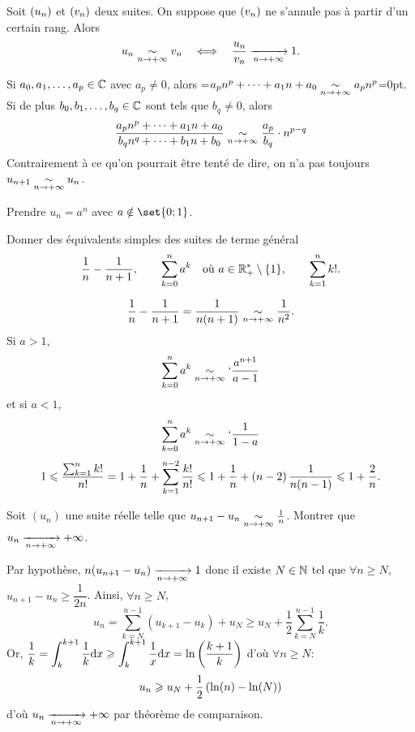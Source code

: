 \documentclass{magnolia}
\begin{document}
\begin{proposition}[utile=-3]
Soit $\left(u_n\right)$ et $\left(v_n\right)$ deux suites. On suppose que $\left(v_n\right)$ ne s'annule
pas à partir d'un certain rang. Alors
\[u_n\underset{n\rightarrow +\infty}{\sim} v_n \quad\Longleftrightarrow\quad \frac{u_n}{v_n}
  \xrightarrow[n\rightarrow +\infty]{} 1.\]
\end{proposition}

\begin{remarques}
\remarque Si $a_0,a_1,\ldots,a_p\in\mathbb{C}$ avec $a_p\neq 0$, alors
  =\hbox{$a_p n^p+\cdots+a_1n+a_0\underset{n\rightarrow +\infty}{\sim} a_p n^p$}=0pt.
  Si de plus $b_0,b_1,\ldots,b_q\in\mathbb{C}$ sont tels que $b_q\neq 0$, alors
  \[\frac{a_p n^p+\cdots+a_1 n+a_0}{b_q n^q+\cdots+b_1 n+b_0}\underset{n\rightarrow +\infty}{\sim}
    \frac{a_p}{b_q}\cdot n^{p-q}\]
\remarque Contrairement à ce qu'on pourrait être tenté de dire, on n'a pas
  toujours $u_{n+1}\underset{n\rightarrow +\infty}{\sim}u_n$.
\begin{sol}
Prendre $u_n=a^n$ avec $a\notin \set{0;1}$.
\end{sol}
\end{remarques}

\begin{exos}
\exo Donner des équivalents simples des suites de terme général
  \[\frac{1}{n}-\frac{1}{n+1}, \qquad \sum_{k=0}^n a^k
    \quad\text{où $a\in\mathbb{R}_+^*\setminus\left\{1\right\}$}, \qquad \sum_{k=1}^n k!.\]
    \begin{sol}
    $$\frac{1}{n}-\frac{1}{n+1}=\frac{1}{n(n+1)}\underset{n\rightarrow +\infty}{\sim}\frac{1}{n^2}.$$
    Si $a>1$, $$\sum_{k=0}^n a^k\underset{n\rightarrow +\infty}{\sim}`\frac{a^{n+1}}{a-1}$$ et si $a<1$, $$\sum_{k=0}^n a^k\underset{n\rightarrow +\infty}{\sim}`\frac{1}{1-a}$$
    $$1\leqslant \frac{\sum_{k=1}^n k!}{n!}=1+\frac{1}{n}+\sum_{k=1}^{n-2}\frac{k!}{n!}\leqslant 1+\frac{1}{n}+\left(n-2\right)\frac{1}{n(n-1)}\leqslant 1+\frac{2}{n}.$$
    
    
    \end{sol}
\exo Soit $(u_n)$ une suite réelle telle que
  $u_{n+1}-u_n \underset{n\rightarrow +\infty}{\sim} \frac{1}{n}$.
  Montrer que $u_n\xrightarrow[n\rightarrow +\infty]{}+\infty$.
  \begin{sol}
  Par hypothèse, $n(u_{n+1}-u_n) \xrightarrow[n\rightarrow +\infty]{}{1}$ donc il existe $N\in \mathbb{N}$ tel que $\forall n \geq N$, $u_{n+1}-u_n \geq \dfrac{1}{2n}$. Ainsi,
  $\forall n \geq N$, $$u_n=\sum_{k=N}^{n-1} (u_{k+1}-u_k) + u_N \geq u_N + \frac{1}{2}\sum_{k=N}^{n-1}\frac{1}{k}.$$
  Or, $\displaystyle \frac{1}{k}=\int_{k}^{k+1}\frac{1}{k}\mathrm{d}x\geqslant \displaystyle \int_{k}^{k+1}\frac{1}{x}\mathrm{d}x=\ln\left(\frac{k+1}{k}\right)$ d'où $\forall n \geq N$: $$u_n \geqslant u_N + \frac{1}{2}\left(\ln(n)-\ln(N)\right)$$ d'où $u_n\xrightarrow[n\rightarrow +\infty]{}+\infty$ par théorème de comparaison.
  \end{sol}
\end{exos}
\end{document}
